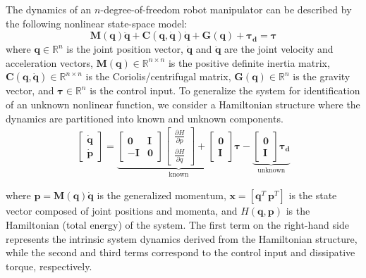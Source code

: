 \documentclass[10pt,twocolumn]{ICCAS}
\newcommand{\R}{\mathbb{R}}
\begin{document}
The dynamics of an $n$-degree-of-freedom robot manipulator can be described by the following nonlinear state-space model:
\begin{equation}
    \bm{M}(\bm{q})\ddot{\bm{q}} + \bm{C}(\bm{q}, \dot{\bm{q}})\dot{\bm{q}} + \bm{G}(\bm{q}) + \bm{\tau_{d}}= \bm{\tau}
    \label{eq:robot_dynamics}
\end{equation}
where $\bm{q} \in \R^{n}$ is the joint position vector, $\dot{\bm{q}}$ and $\ddot{\bm{q}}$ are the joint velocity and acceleration vectors, $\bm{M}(\bm{q}) \in \R^{n \times n}$ is the positive definite inertia matrix, $\mathbf{C}(\bm{q}, \dot{\bm{q}}) \in \R^{n \times n}$ is the Coriolis/centrifugal matrix, $\bm{G}(\bm{q}) \in \R^n$ is the gravity vector, and $\bm{\tau} \in \R^n$ is the control input.
To generalize the system for identification of an unknown nonlinear function, we consider a Hamiltonian structure where the dynamics are partitioned into known and unknown components. 
\begin{align}
    \begin{bmatrix}
        \dot{\bm{q}} \\ \dot{\bm{p}}
    \end{bmatrix}
    =
    \underbrace{
    \begin{bmatrix}
        \mathbf{0} & \mathbf{I} \\
        -\mathbf{I} & \mathbf{0}
    \end{bmatrix}
    \begin{bmatrix}
        \frac{\partial{H}}{\partial{p}} \\ \frac{\partial{H}}{\partial{q}}
    \end{bmatrix}
    +
    \begin{bmatrix}
        \mathbf{0} \\
        \mathbf{I}
    \end{bmatrix} \bm{\tau}}_{\text{known}}
    -
    \underbrace{
    \begin{bmatrix}
        \mathbf{0} \\
        \mathbf{I}
    \end{bmatrix} \bm{\tau_d}
    }_{\text{unknown}}
    \label{eq:robot_dynamics_nonlinear}
\end{align}

where $\bm{p} = \bm{M}(\bm{q})\dot{\bm{q}}$ is the generalized momentum, $\bm{x} = [\bm{q}^{T} \ \bm{p}^{T}]$ is the state vector composed of joint positions and momenta, and $H(\bm{q}, \bm{p})$ is the Hamiltonian (total energy) of the system. The first term on the right-hand side represents the intrinsic system dynamics derived from the Hamiltonian structure, while the second and third terms correspond to the control input and dissipative torque, respectively.
\end{document}
